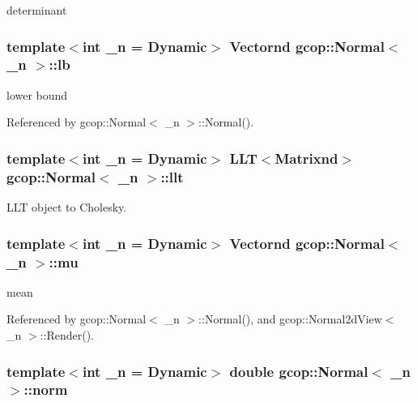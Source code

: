 determinant 

\subsubsection[{lb}]{\setlength{\rightskip}{0pt plus 5cm}template$<$int \-\_\-n = \-Dynamic$>$ {\bf \-Vectornd} {\bf gcop\-::\-Normal}$<$ \-\_\-n $>$\-::{\bf lb}}\label{classgcop_1_1Normal_a0b10c65df227665c8dc99b131da00740}


lower bound 



\-Referenced by gcop\-::\-Normal$<$ \-\_\-n $>$\-::\-Normal().

\subsubsection[{llt}]{\setlength{\rightskip}{0pt plus 5cm}template$<$int \-\_\-n = \-Dynamic$>$ \-L\-L\-T$<${\bf \-Matrixnd}$>$ {\bf gcop\-::\-Normal}$<$ \-\_\-n $>$\-::{\bf llt}}\label{classgcop_1_1Normal_af08c704c90adabb300fc5741325ab769}


\-L\-L\-T object to \-Cholesky. 

\subsubsection[{mu}]{\setlength{\rightskip}{0pt plus 5cm}template$<$int \-\_\-n = \-Dynamic$>$ {\bf \-Vectornd} {\bf gcop\-::\-Normal}$<$ \-\_\-n $>$\-::{\bf mu}}\label{classgcop_1_1Normal_a3cfaf2326502c8165ae90c4523bd203b}


mean 



\-Referenced by gcop\-::\-Normal$<$ \-\_\-n $>$\-::\-Normal(), and gcop\-::\-Normal2d\-View$<$ \-\_\-n $>$\-::\-Render().

\subsubsection[{norm}]{\setlength{\rightskip}{0pt plus 5cm}template$<$int \-\_\-n = \-Dynamic$>$ double {\bf gcop\-::\-Normal}$<$ \-\_\-n $>$\-::{\bf norm}}\label{classgcop_1_1Normal_a51ae242f8461c027fb5f160363ffc9a9}


